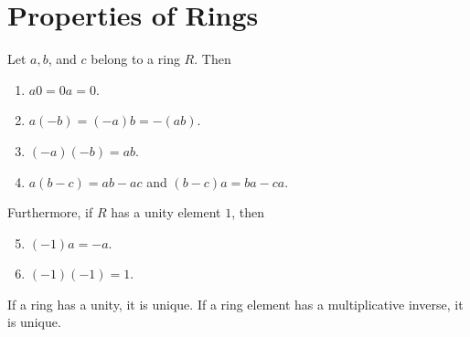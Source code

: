 \section{Properties of Rings}

\begin{theorem}
	Let $a,b$, and $c$ belong to a ring $R$. Then
	\begin{enumerate}
		\item $a0 = 0a = 0$.
		\item $a(-b) = (-a)b = -(ab)$.
		\item $(-a)(-b) = ab$.
		\item $a(b-c) = ab - ac$ and $(b-c)a = ba - ca$.
	\end{enumerate}

	Furthermore, if $R$ has a unity element $1$, then

	\begin{enumerate}
		\setcounter{enumi}{4}
		\item $(-1)a = -a$.
		\item $(-1)(-1) = 1$.
	\end{enumerate}
\end{theorem}

\begin{theorem}
	If a ring has a unity, it is unique. If a ring element has a multiplicative inverse, it is unique.
\end{theorem}
